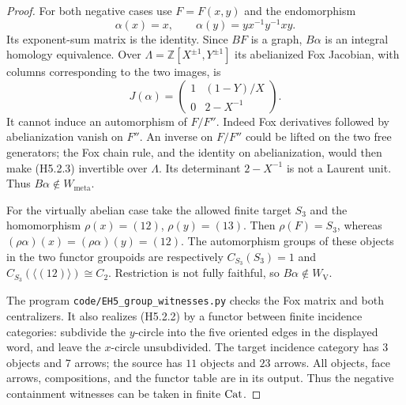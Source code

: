 \begin{proof}
For both negative cases use $F=F(x,y)$ and the endomorphism
\[
 \alpha(x)=x,\qquad
 \alpha(y)=yx^{-1}y^{-1}xy.                              \tag{H5.2.2}
\]
Its exponent-sum matrix is the identity. Since $BF$ is a graph,
$B\alpha$ is an integral homology equivalence.
Over $\Lambda=\mathbb Z[X^{\pm1},Y^{\pm1}]$ its abelianized Fox
Jacobian, with columns corresponding to the two images, is
\[
 J(\alpha)=
 \begin{pmatrix}
 1&(1-Y)/X\\
 0&2-X^{-1}
 \end{pmatrix}.                                         \tag{H5.2.3}
\]
It cannot induce an automorphism of $F/F''$. Indeed Fox
derivatives followed by abelianization vanish on $F''$.
An inverse on $F/F''$ could be lifted on the two free generators;
the Fox chain rule, and the identity on abelianization, would then
make (H5.2.3) invertible over $\Lambda$. Its determinant
$2-X^{-1}$ is not a Laurent unit. Thus $B\alpha\notin W_{\mathrm{meta}}$.

For the virtually abelian case take the allowed finite target
$S_3$ and the homomorphism $\rho(x)=(12)$, $\rho(y)=(13)$.
Then $\rho(F)=S_3$, whereas
$(\rho\alpha)(x)=(\rho\alpha)(y)=(12)$.
The automorphism groups of these objects in the two functor
groupoids are respectively $C_{S_3}(S_3)=1$ and
$C_{S_3}(\langle(12)\rangle)\cong C_2$. Restriction is not fully
faithful, so $B\alpha\notin W_{\mathrm V}$.

The program \texttt{code/EH5\_group\_witnesses.py} checks the Fox
matrix and both centralizers. It also realizes (H5.2.2) by a
functor between finite incidence categories: subdivide the
$y$-circle into the five oriented edges in the displayed word,
and leave the $x$-circle unsubdivided. The target incidence
category has $3$ objects and $7$ arrows; the source has $11$
objects and $23$ arrows. All objects, face arrows, compositions,
and the functor table are in its output. Thus the negative
containment witnesses can be taken in finite $\mathrm{Cat}$.
\end{proof}

